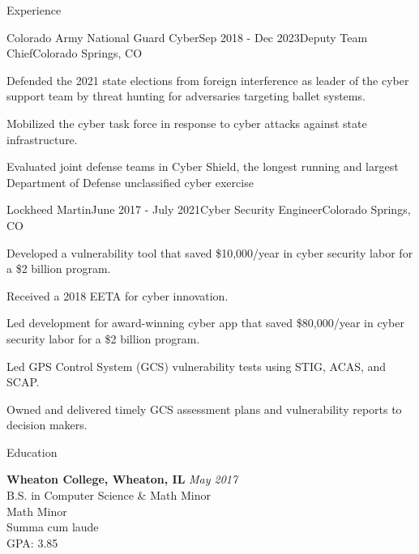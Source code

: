 \documentclass[
	11pt, %
]{resume} %
\begin{document}
\begin{rSection}{Experience}

	\begin{rSubsection}{Colorado Army National Guard Cyber}{Sep 2018 - Dec 2023}{Deputy Team Chief}{Colorado Springs, CO}
		\item Defended the 2021 state elections from foreign interference as leader of the cyber support team by threat hunting for adversaries targeting ballet systems.
		\item Mobilized the cyber task force in response to cyber attacks against state infrastructure.
		\item Evaluated joint defense teams in Cyber Shield, the longest running and largest Department of Defense unclassified cyber exercise
	\end{rSubsection}


	\begin{rSubsection}{Lockheed Martin}{June 2017 - July 2021}{Cyber Security Engineer}{Colorado Springs, CO}
		\item Developed a vulnerability tool that saved \$10,000/year in cyber security labor for a \$2 billion program.
		\item Received a 2018 EETA for cyber innovation.
		\item Led development for award-winning cyber app that saved \$80,000/year in cyber security labor for a \$2 billion program.
		\item Led GPS Control System (GCS) vulnerability tests using STIG, ACAS, and SCAP.
		\item Owned and delivered timely GCS assessment plans and vulnerability reports to decision makers.
	\end{rSubsection}
\end{rSection}


\begin{rSection}{Education}
	
	\textbf{Wheaton College, Wheaton, IL} \hfill \textit{May 2017} \\ 
	B.S. in Computer Science \& Math Minor \\
	Math Minor \\
	Summa cum laude \\
	GPA: 3.85
	
\end{rSection}
\end{document}
